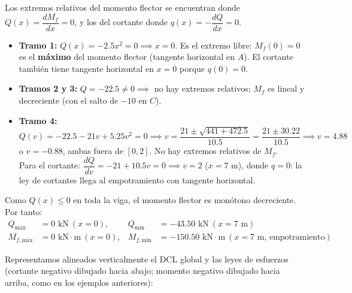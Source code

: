 
Los extremos relativos del momento flector se encuentran donde $Q(x) = \dfrac{dM_f}{dx} = 0$, y los del cortante donde $q(x) = -\dfrac{dQ}{dx} = 0$.
\begin{itemize}
    \item \textbf{Tramo 1:} $Q(x) = -2.5x^2 = 0 \implies x = 0$. Es el extremo libre: $M_f(0) = 0$ es el \textbf{máximo} del momento flector (tangente horizontal en $A$). El cortante también tiene tangente horizontal en $x = 0$ porque $q(0) = 0$.
    \item \textbf{Tramos 2 y 3:} $Q = -22.5 \neq 0 \implies$ no hay extremos relativos; $M_f$ es lineal y decreciente (con el salto de $-10$ en $C$).
    \item \textbf{Tramo 4:} $Q(v) = -22.5 - 21v + 5.25v^2 = 0 \implies v = \dfrac{21 \pm \sqrt{441 + 472.5}}{10.5} = \dfrac{21 \pm 30.22}{10.5} \implies v = 4.88$ o $v = -0.88$, ambas fuera de $[0, 2]$. No hay extremos relativos de $M_f$. \\
          Para el cortante: $\dfrac{dQ}{dv} = -21 + 10.5v = 0 \implies v = 2$ ($x = 7\text{ m}$), donde $q = 0$: la ley de cortantes llega al empotramiento con tangente horizontal.
\end{itemize}
Como $Q(x) \le 0$ en toda la viga, el momento flector es monótono decreciente. Por tanto:
\begin{align*}
    Q_{\text{máx}}   & = 0\text{ kN} \ (x = 0),              & Q_{\text{mín}}   & = -43.50\text{ kN} \ (x = 7\text{ m})                                      \\
    M_{f,\text{máx}} & = 0\text{ kN}\cdot\text{m} \ (x = 0), & M_{f,\text{mín}} & = \boxed{-150.50\text{ kN}\cdot\text{m}} \ (x = 7\text{ m, empotramiento})
\end{align*}


Representamos alineados verticalmente el DCL global y las leyes de esfuerzos (cortante negativo dibujado hacia abajo; momento negativo dibujado hacia arriba, como en los ejemplos anteriores):

